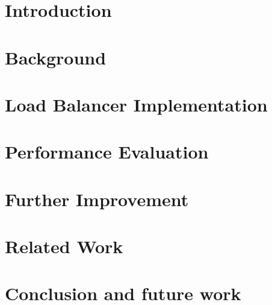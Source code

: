 
\graphicspath{{Manuscript/}}

\chapter{Introduction}\label{chapter:introduction}


\chapter{Background}\label{chapter:background}


\chapter{Load Balancer Implementation}\label{chapter:lb_implementation}

%
%

\chapter{Performance Evaluation}\label{chapter:portablelb}



\chapter{Further Improvement}\label{chapter:performance}


\chapter{Related Work}\label{chapter:related}


\chapter{Conclusion and future work }\label{chapter:conclusion}



%


